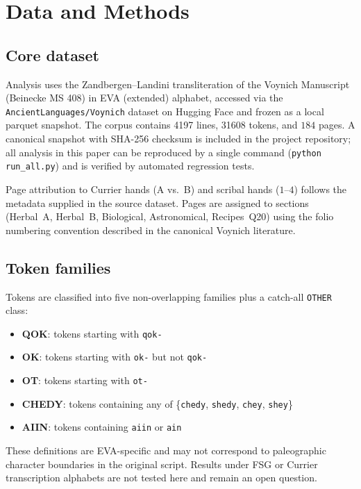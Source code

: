 \documentclass[11pt]{article}
\begin{document}
\section{Data and Methods}
\label{sec:methods}

\subsection{Core dataset}

Analysis uses the Zandbergen--Landini transliteration of the Voynich
Manuscript (Beinecke MS 408) in EVA (extended) alphabet, accessed via the
\texttt{AncientLanguages/Voynich} dataset on Hugging Face and frozen as a
local parquet snapshot. The corpus contains \num{4197} lines, \num{31608}
tokens, and $184$ pages. A canonical snapshot with SHA-256 checksum is
included in the project repository; all analysis in this paper can be
reproduced by a single command (\texttt{python run\_all.py}) and is verified
by automated regression tests.

Page attribution to Currier hands (A vs.~B) and scribal hands ($1$--$4$)
follows the metadata supplied in the source dataset. Pages are assigned to
sections (Herbal~A, Herbal~B, Biological, Astronomical, Recipes~Q20) using
the folio numbering convention described in the canonical Voynich literature.

\subsection{Token families}

Tokens are classified into five non-overlapping families plus a catch-all
\texttt{OTHER} class:

\begin{itemize}
  \item \textbf{QOK}: tokens starting with \texttt{qok-}
  \item \textbf{OK}: tokens starting with \texttt{ok-} but not \texttt{qok-}
  \item \textbf{OT}: tokens starting with \texttt{ot-}
  \item \textbf{CHEDY}: tokens containing any of \{\texttt{chedy},
        \texttt{shedy}, \texttt{chey}, \texttt{shey}\}
  \item \textbf{AIIN}: tokens containing \texttt{aiin} or \texttt{ain}
\end{itemize}

These definitions are EVA-specific and may not correspond to paleographic
character boundaries in the original script. Results under FSG or Currier
transcription alphabets are not tested here and remain an open question.
\end{document}
